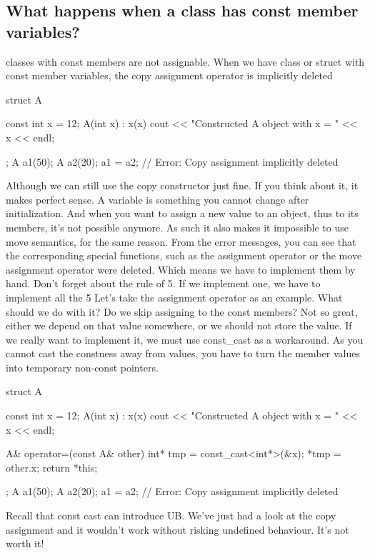 \documentclass{report}
\begin{document}
\subsection{What happens when a class has const member variables?}
\bigbreak \noindent 
classes with const members are not assignable. When we have class or struct with const member variables, the copy assignment operator is implicitly deleted
\bigbreak \noindent 
\begin{cppcode}
    struct A {
        const int x = 12;
        A(int x) : x(x) { cout << "Constructed A object with x = " << x << endl; } 

    };
    A a1(50);
    A a2(20);
    a1 = a2; // Error: Copy assignment implicitly deleted
\end{cppcode}
\bigbreak \noindent 
Although we can still use the copy constructor just fine.
\bigbreak \noindent 
If you think about it, it makes perfect sense. A variable is something you cannot change after initialization. And when you want
to assign a new value to an object, thus to its members, it’s not
possible anymore.
\bigbreak \noindent 
As such it also makes it impossible to use move semantics, for the
same reason.
\bigbreak \noindent 
From the error messages, you can see that the corresponding special
functions, such as the assignment operator or the move assignment
operator were deleted. Which means we have to implement them
by hand. Don’t forget about the rule of 5. If we implement one,
we have to implement all the 5
\bigbreak \noindent 
Let’s take the assignment operator as an example. What should we
do with it?
\bigbreak \noindent 
Do we skip assigning to the const members? Not so great, either we
depend on that value somewhere, or we should not store the value.
\bigbreak \noindent 
If we really want to implement it, we must use const\_cast as a
workaround. As you cannot cast the constness away from values,
you have to turn the member values into temporary non-const
pointers.
\bigbreak \noindent 
\begin{cppcode}
    struct A {
        const int x = 12;
        A(int x) : x(x) { cout << "Constructed A object with x = " << x << endl; } 

        A& operator=(const A& other) {
            int* tmp = const_cast<int*>(&x);
            *tmp = other.x;
            return *this;
        }
    };
    A a1(50);
    A a2(20);
    a1 = a2; // Error: Copy assignment implicitly deleted
\end{cppcode}
\bigbreak \noindent 
Recall that const cast can introduce UB. We’ve just had a look at the copy assignment and it wouldn’t work
without risking undefined behaviour.
\bigbreak \noindent 
It’s not worth it!













 
\end{document}
